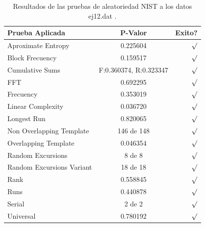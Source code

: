 \documentclass[10pt]{IEEEtran}
\begin{document}
\begin{table}[H]
\caption{Resultados de las pruebas de aleatoriedad NIST a los datos ej12.dat .}
\label{caso12}
\begin{center}
\begin{small}
\begin{tabular}{|l|c|r|}
\hline

Prueba Aplicada &  P-Valor & Exito? \\
\hline

Aproximate Entropy    &   0.225604  & $\surd$ \\

Block Frecuency  & 0.159517  &   $\surd$  \\

Cumulative Sums    &   F:0.360374, R:0.323347 & $\surd$ \\

FFT    &    0.692295  &  $\surd$     \\

Frecuency     & 0.353019 &  $\surd$   \\

Linear Complexity      & 0.036720 & $\surd$ \\

Longest Run      &   0.820065 &    $\surd$      \\

Non Overlapping Template      & 146 de 148    &     $\surd$          \\

Overlapping Template      & 0.046354  &      $\surd$      \\

Random Excursions      & 8 de 8  &    $\surd$      \\
Random Excursions Variant & 18 de 18 &     $\surd$    \\

Rank & 0.558845  &      $\surd$      \\

Runs &   0.440878 &     $\surd$        \\

Serial &     2 de 2    &     $\surd$        \\

Universal &  0.780192 &   $\surd$            \\

\hline

\end{tabular}
\end{small}
\end{center}
\end{table}
\end{document}
